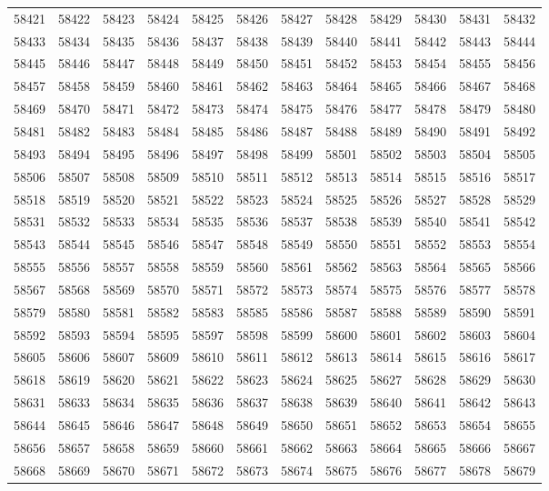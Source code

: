 \begin{center}
\begin{longtable}{llllllllllll}
58421 &58422 &58423 &58424 &58425 &58426 &58427 &58428 &58429 &58430 &58431 &58432 \\
58433 &58434 &58435 &58436 &58437 &58438 &58439 &58440 &58441 &58442 &58443 &58444 \\
58445 &58446 &58447 &58448 &58449 &58450 &58451 &58452 &58453 &58454 &58455 &58456 \\
58457 &58458 &58459 &58460 &58461 &58462 &58463 &58464 &58465 &58466 &58467 &58468 \\
58469 &58470 &58471 &58472 &58473 &58474 &58475 &58476 &58477 &58478 &58479 &58480 \\
58481 &58482 &58483 &58484 &58485 &58486 &58487 &58488 &58489 &58490 &58491 &58492 \\
58493 &58494 &58495 &58496 &58497 &58498 &58499 &58501 &58502 &58503 &58504 &58505 \\
58506 &58507 &58508 &58509 &58510 &58511 &58512 &58513 &58514 &58515 &58516 &58517 \\
58518 &58519 &58520 &58521 &58522 &58523 &58524 &58525 &58526 &58527 &58528 &58529 \\
58531 &58532 &58533 &58534 &58535 &58536 &58537 &58538 &58539 &58540 &58541 &58542 \\
58543 &58544 &58545 &58546 &58547 &58548 &58549 &58550 &58551 &58552 &58553 &58554 \\
58555 &58556 &58557 &58558 &58559 &58560 &58561 &58562 &58563 &58564 &58565 &58566 \\
58567 &58568 &58569 &58570 &58571 &58572 &58573 &58574 &58575 &58576 &58577 &58578 \\
58579 &58580 &58581 &58582 &58583 &58585 &58586 &58587 &58588 &58589 &58590 &58591 \\
58592 &58593 &58594 &58595 &58597 &58598 &58599 &58600 &58601 &58602 &58603 &58604 \\
58605 &58606 &58607 &58609 &58610 &58611 &58612 &58613 &58614 &58615 &58616 &58617 \\
58618 &58619 &58620 &58621 &58622 &58623 &58624 &58625 &58627 &58628 &58629 &58630 \\
58631 &58633 &58634 &58635 &58636 &58637 &58638 &58639 &58640 &58641 &58642 &58643 \\
58644 &58645 &58646 &58647 &58648 &58649 &58650 &58651 &58652 &58653 &58654 &58655 \\
58656 &58657 &58658 &58659 &58660 &58661 &58662 &58663 &58664 &58665 &58666 &58667 \\
58668 &58669 &58670 &58671 &58672 &58673 &58674 &58675 &58676 &58677 &58678 &58679 \\

\end{longtable}
\end{center}
